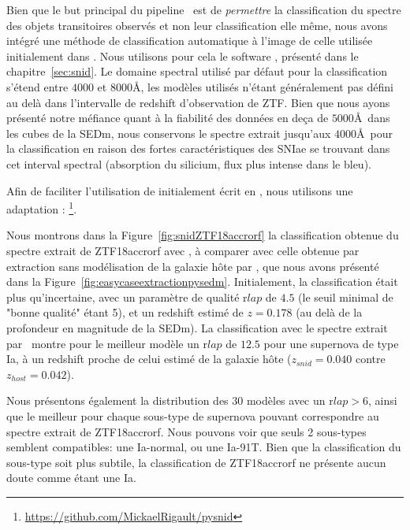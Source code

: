 \documentclass[../main/main.tex]{subfiles}
\begin{document}
Bien que le but principal du pipeline \hypergal\ est de
\textit{permettre} la classification du spectre des objets transitoires
observés et non leur classification elle même, nous avons intégré une méthode de classification automatique à l'image de celle
utilisée initialement dans . Nous utilisons pour cela le
software , présenté dans le chapitre~\ref{sec:snid}. Le
domaine spectral utilisé par défaut pour la classification s'étend entre
$4000$ et $8000$\AA, les modèles utilisés n'étant généralement pas
défini au delà dans l'intervalle de redshift d'observation de ZTF. Bien
que nous ayons présenté notre méfiance quant à la fiabilité des données
en deça de $5000$\AA\ dans les cubes de la SEDm, nous conservons le
spectre extrait jusqu'aux $4000$\AA\ pour la classification en raison des fortes
caractéristiques des SNIae se trouvant dans cet interval spectral
(absorption du silicium, flux plus intense dans le bleu).

Afin de faciliter l'utilisation de  initialement écrit en
, nous utilisons une adaptation :
\footnote{\url{https://github.com/MickaelRigault/pysnid}}.

Nous montrons dans la Figure~\ref{fig:snidZTF18accrorf} la
classification obtenue du spectre extrait de ZTF18accrorf avec \hypergal, à comparer
avec celle obtenue par extraction sans modélisation de la galaxie hôte
par \pysedm, que nous avons présenté dans la
Figure~\ref{fig:easycaseextractionpysedm}. Initialement, la
classification était plus qu'incertaine, avec un paramètre de qualité
r$lap$ de $4.5$ (le seuil minimal de "bonne qualité" étant 5), et un
redshift estimé de $z=0.178$ (au delà de la profondeur en magnitude de
la SEDm).
La classification avec le spectre extrait par \hypergal\ montre pour le
meilleur modèle un r$lap$ de $12.5$ pour une supernova de type Ia, à un
redshift proche de celui estimé de la galaxie hôte ($z_{snid}=0.040$
contre $z_{host}=0.042$).

Nous présentons également la distribution des $30$ modèles avec un
r$lap>6$, ainsi que le meilleur pour chaque sous-type de supernova
pouvant correspondre au spectre extrait de ZTF18accrorf. Nous pouvons
voir que seuls 2 sous-types semblent compatibles: une Ia-normal, ou une
Ia-91T. Bien que la classification du sous-type soit plus subtile, la
classification de ZTF18accrorf ne présente aucun doute comme étant une
Ia.
\end{document}
